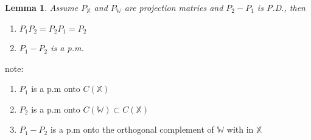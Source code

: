 \documentclass{article}
\newtheorem{lemma}[theorem]{Lemma}
\begin{document}
\bigskip

\begin{lemma}
Assume $P_{\mathbb{X}}$ and $P_{\mathbb{W}}$ are projection matries and $%
P_{2}-P_{1}$ is P.D., then

\begin{enumerate}
\item $P_{1}P_{2}=P_{2}P_{1}=P_{2}$

\item $P_{1}-P_{2}$ is a p.m.
\end{enumerate}
\end{lemma}

\bigskip

note:

\begin{enumerate}
\item $P_{1}$ is a p.m onto $C\left( \mathbb{X}\right) $

\item $P_{2}$ is a p.m onto $C\left( \mathbb{W}\right) \subset C\left( 
\mathbb{X}\right) $

\item $P_{1}-P_{2}$ is a p.m onto the orthogonal complement of $\mathbb{W}$
with in $\mathbb{X}$
\end{enumerate}

\bigskip


\bigskip
\end{document}
